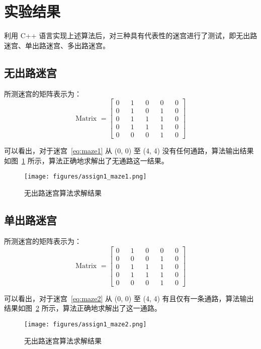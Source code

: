 \documentclass[UTF8,cs4size]{ctexart}
\begin{document}
\section{实验结果}
利用 C++ 语言实现上述算法后，对三种具有代表性的迷宫进行了测试，即无出路迷宫、单出路迷宫、多出路迷宫。
\subsection{无出路迷宫}
所测迷宫的矩阵表示为：
\begin{equation}
  \text{Matrix } =
  \begin{bmatrix}
    0 && 1 && 0 && 0 && 0 \\
    0 && 1 && 0 && 1 && 0 \\
    0 && 1 && 1 && 1 && 0 \\
    0 && 1 && 1 && 1 && 0 \\
    0 && 0 && 0 && 1 && 0
    \label{eq:maze1}
  \end{bmatrix}
\end{equation}

可以看出，对于迷宫~\eqref{eq:maze1} 从 (0, 0) 至 (4, 4) 没有任何通路，算法输出结果如图~\ref{fig:maze1} 所示，算法正确地求解出了无通路这一结果。
\begin{figure}[htb]
  \centering
    \texttt{[image: figures/assign1\_maze1.png]}
  \caption{无出路迷宫算法求解结果}
  \label{fig:maze1}
\end{figure}

\subsection{单出路迷宫}
所测迷宫的矩阵表示为：
\begin{equation}
  \text{Matrix } =
  \begin{bmatrix}
    0 && 1 && 0 && 0 && 0 \\
    0 && 0 && 0 && 1 && 0 \\
    0 && 1 && 1 && 1 && 0 \\
    0 && 1 && 1 && 1 && 0 \\
    0 && 0 && 0 && 1 && 0
    \label{eq:maze2}
  \end{bmatrix}
\end{equation}

可以看出，对于迷宫~\eqref{eq:maze2} 从 (0, 0) 至 (4, 4) 有且仅有一条通路，算法输出结果如图~\ref{fig:maze2} 所示，算法正确地求解出了这一通路。
\begin{figure}[htb]
  \centering
    \texttt{[image: figures/assign1\_maze2.png]}
  \caption{无出路迷宫算法求解结果}
  \label{fig:maze2}
\end{figure}
\end{document}
